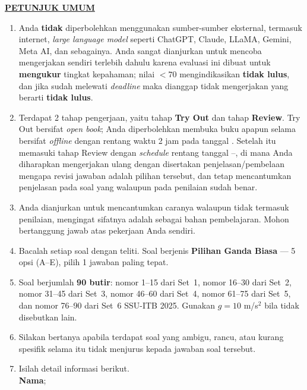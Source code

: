 \documentclass[11pt]{article}
\begin{document}
\noindent\textbf{\underline{PETUNJUK UMUM}}
\begin{enumerate}[leftmargin=*,itemsep=4pt,topsep=4pt]
  \item Anda \textbf{tidak} diperbolehkan menggunakan sumber-sumber eksternal,
        termasuk internet, \textit{large language model} seperti ChatGPT, Claude,
        LLaMA, Gemini, Meta AI, dan sebagainya. Anda sangat dianjurkan untuk
        mencoba mengerjakan sendiri terlebih dahulu karena evaluasi ini dibuat
        untuk \textbf{mengukur} tingkat kepahaman; nilai $<70$ mengindikasikan
        \textbf{tidak lulus}, dan jika sudah melewati \textit{deadline} maka
        dianggap tidak mengerjakan yang berarti \textbf{tidak lulus}.

  \item Terdapat 2 tahap pengerjaan, yaitu tahap \textbf{Try Out} dan tahap
        \textbf{Review}. Try Out bersifat \textit{open book}; Anda diperbolehkan
        membuka buku apapun selama bersifat \textit{offline} dengan rentang waktu
        2 jam pada tanggal \underline{\hspace{3cm}}. Setelah itu memasuki
        tahap Review dengan \textit{schedule} rentang tanggal
        \underline{\hspace{3cm}}--\underline{\hspace{3cm}}, di mana Anda
        diharapkan mengerjakan ulang dengan disertakan penjelasan/pembelaan
        mengapa revisi jawaban adalah pilihan tersebut, dan tetap mencantumkan
        penjelasan pada soal yang walaupun pada penilaian sudah benar.

  \item Anda dianjurkan untuk mencantumkan caranya walaupun tidak termasuk
        penilaian, mengingat sifatnya adalah sebagai bahan pembelajaran.
        Mohon bertanggung jawab atas pekerjaan Anda sendiri.

  \item Bacalah setiap soal dengan teliti. Soal berjenis
        \textbf{Pilihan Ganda Biasa} --- 5 opsi (A--E), pilih
        1 jawaban paling tepat.

  \item Soal berjumlah \textbf{90 butir}: nomor 1--15 dari Set~1,
        nomor 16--30 dari Set~2, nomor 31--45 dari Set~3,
        nomor 46--60 dari Set~4, nomor 61--75 dari Set~5, dan
        nomor 76--90 dari Set~6 SSU-ITB 2025.
        Gunakan $g=10$ m/s$^2$ bila tidak disebutkan lain.

  \item Silakan bertanya apabila terdapat soal yang ambigu, rancu, atau
        kurang spesifik selama itu tidak menjurus kepada jawaban soal
        tersebut.

  \item Isilah detail informasi berikut.\\[0.3em]
        \textbf{Nama}\hspace{0.45cm};\enspace\underline{\hspace{8cm}}
\end{enumerate}
\end{document}
